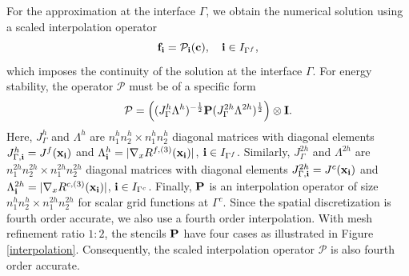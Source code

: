 {{For the approximation at the interface $\Gamma$, we obtain the numerical solution using a scaled interpolation operator
\begin{equation}\label{continuous_sol}
{\bf f}_{\bf i} = {\mathcal{P}}_{\bf i}({\bf c}),\quad {\bf i}\in I_{\Gamma^f},
\end{equation}
which imposes the continuity of the solution at the interface $\Gamma$. 
For energy stability, the operator ${\mathcal{P}}$ must be of a specific form
\begin{equation}\label{scaleP}
{\mathcal{P}} = \left(({J}^h_\Gamma {\Lambda}^h)^{-\frac{1}{2}}{\bf P}({J}^{2h}_\Gamma {\Lambda}^{2h})^{\frac{1}{2}}\right)\otimes{\bf I}.
\end{equation}
Here, $J_{\Gamma}^h$ and $\Lambda^h$ are $n_1^{h}n_2^{h}\times n_1^{h}n_2^{h}$ diagonal matrices with diagonal elements $J_{\Gamma,{\bf i}}^h = J^f({\bf x}_{\bf i})$ and $\Lambda_{\bf i}^h = |\nabla_xR^{f,(3)}({\bf x}_{\bf i})|$, ${\bf i}\in I_{\Gamma^f}$. Similarly, ${J}_{\Gamma}^{2h}$ and ${{\Lambda}^{2h}}$ are $n_1^{2h}n_2^{2h}\times n_1^{2h}n_2^{2h}$ diagonal matrices with diagonal elements $J_{\Gamma,{\bf i}}^{2h} = J^c({\bf x}_{\bf i})$ and $\Lambda_{\bf i}^{2h} = |\nabla_xR^{c,(3)}({\bf x}_{\bf i})|$, ${\bf i}\in I_{\Gamma^c}$. Finally, ${\bf P}$ is an interpolation operator of size $n_1^hn_2^h\times n_1^{2h}n_2^{2h}$ for scalar grid functions at $\Gamma^c$. Since the spatial discretization is fourth order accurate, we also use a fourth order interpolation. With mesh refinement ratio  $1:2$, the stencils ${\bf P}$ have four cases as illustrated in  Figure \ref{interpolation}. Consequently, the scaled interpolation operator $\mathcal{P}$ is also fourth order accurate.

}}

